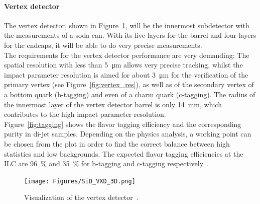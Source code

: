 \paragraph{Vertex detector}
The vertex detector, shown in Figure~\ref{fig:SiD_VXD}, will be the innermost subdetector with the measurements of a soda can.
With its five layers for the barrel and four layers for the endcaps, it will be able to do very precise measurements.
\\The requirements for the vertex detector performance are very demanding:
The spatial resolution with less than \SI{5}{\micro\meter} allows very precise tracking, whilst the impact parameter resolution is aimed for about \SI{3}{\micro\meter} for the verification of the primary vertex (see Figure~\ref{fig:vertex_res}), as well as of the secondary vertex of a bottom quark (b-tagging) and even of a charm quark (c-tagging).
The radius of the innermost layer of the vertex detector barrel is only \SI{14}{\milli\meter}, which contributes to the high impact parameter resolution.
\\Figure~\ref{fig:tagging} shows the flavor tagging efficiency and the corresponding purity in di-jet samples.
Depending on the physics analysis, a working point can be chosen from the plot in order to find the correct balance between high statistics and low backgrounds.
The expected flavor tagging efficiencies at the ILC are \SI{96}{\percent} and \SI{35}{\percent} for b-tagging and c-tagging respectively~\cite[p. 54]{TDR2}.
\begin{figure}[t!]
\centering
\texttt{[image: Figures/SiD\_VXD\_3D.png]}
\caption[Visualization of the \sid vertex detector]{Visualization of the \sid vertex detector~\cite{SiD_Update2}.}
\label{fig:SiD_VXD}
\end{figure}
